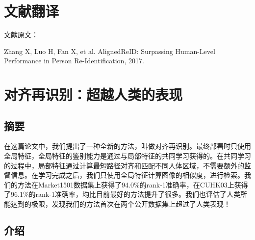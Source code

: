 
\chapter{文献翻译}

 {
  \setlength{\parindent}{0em}

  文献原文：

  Zhang X, Luo H, Fan X, et al. AlignedReID: Surpassing Human-Level Performance in Person Re-Identification, 2017. \par

 }

\vspace{2em}

{
	\renewcommand{\cleardoublepage}{}
	\renewcommand{\clearpage}{}
	\titleformat{\chapter}[block]{\sanhao\songti\bfseries\filcenter}{}{0em}{}{}
	\chapter*{对齐再识别：超越人类的表现}
}

\section*{摘要}

在这篇论文中，我们提出了一种全新的方法，叫做对齐再识别。最终部署时只使用全局特征，全局特征的鉴别能力是通过与局部特征的共同学习获得的。在共同学习的过程中，局部特征通过计算最短路径对齐和匹配不同人体区域，不需要额外的监督信息。在学习完成之后，我们只使用全局特征计算图像的相似度，进行检索。我们的方法在Market1501数据集上获得了94.0\%的rank-1准确率，在CUHK03上获得了96.1\%的rank-1准确率，均比目前最好的方法提升了很多。我们也评估了人类所能达到的极限，发现我们的方法首次在两个公开数据集上超过了人类表现！

\section{介绍}

